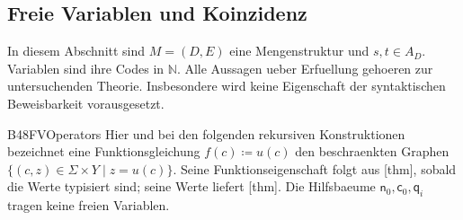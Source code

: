 \subsection{Freie Variablen und Koinzidenz}

In diesem Abschnitt sind \(M=(D,E)\) eine Mengenstruktur und
\(s,t\in A_D\). Variablen sind ihre Codes in \(\mathbb N\).
Alle Aussagen ueber Erfuellung gehoeren zur untersuchenden Theorie.
Insbesondere wird keine Eigenschaft der syntaktischen Beweisbarkeit
vorausgesetzt.

{B48FVOperators}{
}
Hier und bei den folgenden rekursiven Konstruktionen bezeichnet eine
Funktionsgleichung \(f(c)\coloneq u(c)\) den beschraenkten Graphen
\(\{(c,z)\in\Sigma\times Y\mid z=u(c)\}\).
Seine Funktionseigenschaft folgt aus
[thm], sobald die Werte typisiert
sind; seine Werte liefert [thm].
Die Hilfsbaeume \(\mathsf n_0,\mathsf c_0,\mathsf q_i\) tragen keine
freien Variablen.

